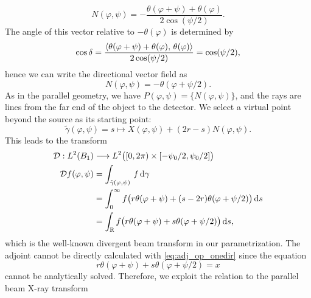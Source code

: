 \documentclass{amsart}
\renewcommand*{\phi}{\varphi}
\begin{document}
\begin{example}
\begin{equation*}
  N(\phi,\psi) = - \frac{\theta(\phi + \psi) + \theta(\phi)}{2 \cos(\psi/2)}.
 \end{equation*}
 The angle of this vector relative to $-\theta(\phi)$ is determined by
 \begin{equation*}
  \cos\delta = \frac{\INNER{\theta(\phi + \psi) + \theta(\phi)}{\theta(\phi)}}{2 \cos(\psi/2)} = \cos(\psi/2),
 \end{equation*}
 hence we can write the directional vector field as
 \begin{equation}
  \label{eq:fanbeam_dir_field}
  N(\phi,\psi) = - \theta(\phi + \psi/2).
 \end{equation} 
 As in the parallel geometry, we have $P(\phi,\psi) = \lbrace N(\phi,\psi)\rbrace$, and the rays are lines from the far end of 
 the object to the detector. We select a virtual point beyond the source as its starting point:
 \begin{equation*}
  \tilde \gamma(\phi, \psi) = s \mapsto X(\phi,\psi) + (2r-s) N(\phi,\psi).
 \end{equation*}
 This leads to the transform
 \begin{align}
  \OPD: L^2(B_1) &\Lto L^2\big([0,2\pi) \times [-\psi_0/2, \psi_0/2]\big)\\
  \OPD f(\phi, \psi)
  &= \int_{\tilde \gamma(\phi,\psi)}\, f \, \D \gamma \notag \\
  &= \int_0^\infty f\big(r\theta(\phi + \psi) + (s-2r)\theta(\phi + \psi/2)\big)\, \D s \notag \\
  \label{eq:fanbeam_fwdproj_alt}
  &= \int_\RR f\big(r\theta(\phi + \psi) + s\theta(\phi + \psi/2)\big)\, \D s,
 \end{align}
 which is the well-known divergent beam transform
 in our parametrization. The adjoint cannot be directly calculated with \eqref{eq:adj_op_onedir} since the equation 
 \begin{equation*}
  r\theta(\phi + \psi) + s\theta(\phi + \psi/2) = x
 \end{equation*}
 cannot be analytically solved. Therefore, we exploit the relation to the parallel beam X-ray transform 
\end{example}
\end{document}
